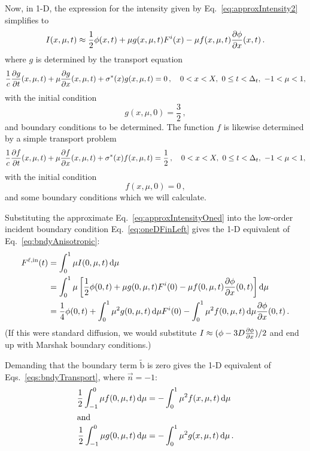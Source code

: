 Now, in 1-D, the \APone{} expression for the intensity given by
Eq.~\eqref{eq:approxIntensity2} simplifies to
\begin{equation} \label{eq:approxIntensityOned}
  I(x, \mu, t) \approx \frac{1}{2} \phi(x, t) + \mu g(x, \mu, t) F^i(x)
  -  \mu f(x,\mu,t) \frac{\partial \phi}{\partial x}(x, t)\,.
\end{equation}
where $g$ is determined by the transport equation
\begin{equation*}
  \frac{1}{c} \frac{\partial g}{\partial t}(x, \mu, t)
  + \mu \frac{\partial g}{\partial x}(x, \mu, t) + \sigma^\ast(x) g (x, \mu, t)
  = 0\,, \quad
0 < x < X,\  0 \le t < \Delta_t, \ -1 < \mu < 1,
\end{equation*}
with the initial condition
\begin{equation*}
  g(x, \mu, 0) = \frac{3}{2}\,,
\end{equation*}
and boundary conditions to be determined. The function $f$ is likewise
determined by a simple transport problem
\begin{equation*}
  \frac{1}{c} \frac{\partial f}{\partial t}(x, \mu, t)
  + \mu \frac{\partial f}{\partial x}(x, \mu, t) + \sigma^\ast(x) f (x, \mu, t)
  = \frac{1}{2} \,, \quad
0 < x < X,\  0 \le t < \Delta_t, \ -1 < \mu < 1,
\end{equation*}
with the initial condition
\begin{equation*}
  f(x, \mu, 0) = 0\,,
\end{equation*}
and some boundary conditions which we will calculate.

Substituting the approximate Eq.~\eqref{eq:approxIntensityOned} into the
low-order incident boundary condition Eq.~\eqref{eq:oneDFinLeft} gives the 1-D
equivalent of Eq.~\eqref{eq:bndyAnisotropic}:
\begin{align} \nonumber
  F^{\ell,\mathrm{in}}(t)
  &= \int_{0}^{1} \mu I(0, \mu, t) \mathop{}\!\mathrm{d} \mu
  \\ \nonumber
  &= \int_{0}^{1} \mu \left[ \frac{1}{2} \phi(0, t) + \mu g(0, \mu, t) F^i(0)
  -  \mu f(0,\mu,t) \frac{\partial \phi}{\partial x}(0, t) \right] \mathop{}\!\mathrm{d} \mu
  \\ \label{eq:bndyAnisotropicOned}
  &= \frac{1}{4} \phi(0, t)
  + \int_{0}^{1} \mu^2 g(0, \mu, t) \mathop{}\!\mathrm{d} \mu F^i(0)
  - \int_{0}^{1} \mu^2 f(0, \mu, t) \mathop{}\!\mathrm{d} \mu \frac{\partial \phi}{\partial x}(0, t) \,.
\end{align}
(If this were standard diffusion, we would substitute $I \approx (\phi - 3 D
\frac{\partial \phi}{\partial x})/2$ and end up with Marshak boundary conditions.)

Demanding that the boundary term $\mathrm{ \tilde b}$ is zero gives the 1-D
equivalent of Eqs.~\eqref{eqs:bndyTransport}, where $\vec{n} = -1$:
\begin{subequations} \label{eqs:bndyTransportOned}
\begin{align} \label{eq:bndyFOned}
  \frac{1}{2} \int_{-1}^{0} \mu f(0, \mu, t) \mathop{}\!\mathrm{d}\mu
  &= - \int_{0}^{1} \mu^2 f(x, \mu, t) \mathop{}\!\mathrm{d}\mu
 \\ \intertext{and} \label{eq:bndyGOned}
  \frac{1}{2} \int_{-1}^{0} \mu g(0, \mu, t) \mathop{}\!\mathrm{d}\mu
  &= - \int_{0}^{1} \mu^2 g(x, \mu, t) \mathop{}\!\mathrm{d}\mu \,.
\end{align}
\end{subequations}

